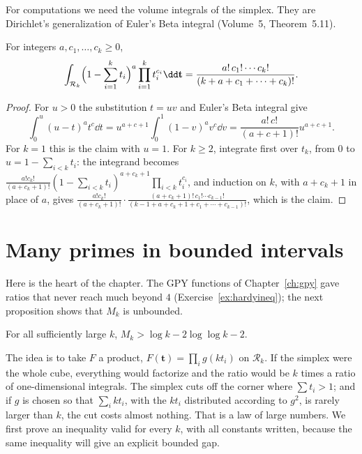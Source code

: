 For computations we need the volume integrals of the simplex. They are Dirichlet's generalization of Euler's Beta integral (Volume~5, Theorem~5.11).

\begin{lemma}[Dirichlet]\label{lem:dirichletint}
For integers $a,c_1,\dots,c_k\ge0$,
\[
\int_{\mathcal R_k}\Bigl(1-\sum_{i=1}^kt_i\Bigr)^a\prod_{i=1}^kt_i^{c_i}\dd\mathbf t=\frac{a!\,c_1!\cdots c_k!}{(k+a+c_1+\cdots+c_k)!}.
\]
\end{lemma}
\begin{proof}
For $u>0$ the substitution $t=uv$ and Euler's Beta integral give
\[
\int_0^u(u-t)^at^c\dd t=u^{a+c+1}\int_0^1(1-v)^av^c\dd v=\frac{a!\,c!}{(a+c+1)!}u^{a+c+1}.
\]
For $k=1$ this is the claim with $u=1$. For $k\ge2$, integrate first over $t_k$, from $0$ to $u=1-\sum_{i<k}t_i$: the integrand becomes $\frac{a!c_k!}{(a+c_k+1)!}(1-\sum_{i<k}t_i)^{a+c_k+1}\prod_{i<k}t_i^{c_i}$, and induction on $k$, with $a+c_k+1$ in place of $a$, gives $\frac{a!c_k!}{(a+c_k+1)!}\cdot\frac{(a+c_k+1)!\,c_1!\cdots c_{k-1}!}{(k-1+a+c_k+1+c_1+\cdots+c_{k-1})!}$, which is the claim.
\end{proof}

\section{Many primes in bounded intervals}

Here is the heart of the chapter. The GPY functions of Chapter~\ref{ch:gpy} gave ratios that never reach much beyond $4$ (Exercise~\ref{ex:hardyineq}); the next proposition shows that $M_k$ is unbounded.

\begin{proposition}[Maynard]\label{prop:mklower}
For all sufficiently large $k$, $M_k>\log k-2\log\log k-2$.
\end{proposition}

The idea is to take $F$ a product, $F(\mathbf t)=\prod_ig(kt_i)$ on $\mathcal R_k$. If the simplex were the whole cube, everything would factorize and the ratio would be $k$ times a ratio of one-dimensional integrals. The simplex cuts off the corner where $\sum t_i>1$; and if $g$ is chosen so that $\sum_i kt_i$, with the $kt_i$ distributed according to $g^2$, is rarely larger than $k$, the cut costs almost nothing. That is a law of large numbers. We first prove an inequality valid for every $k$, with all constants written, because the same inequality will give an explicit bounded gap.

